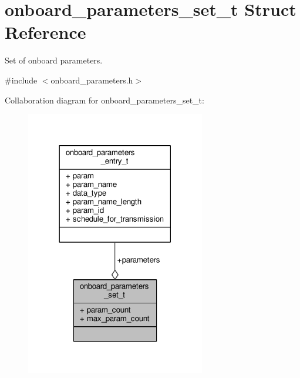 \hypertarget{structonboard__parameters__set__t}{\section{onboard\+\_\+parameters\+\_\+set\+\_\+t Struct Reference}
\label{structonboard__parameters__set__t}
}


Set of onboard parameters.  




{\ttfamily \#include $<$onboard\+\_\+parameters.\+h$>$}



Collaboration diagram for onboard\+\_\+parameters\+\_\+set\+\_\+t\+:
\nopagebreak
\begin{figure}[H]
\begin{center}
\leavevmode
\includegraphics[width=222pt]{structonboard__parameters__set__t__coll__graph}
\end{center}
\end{figure}
